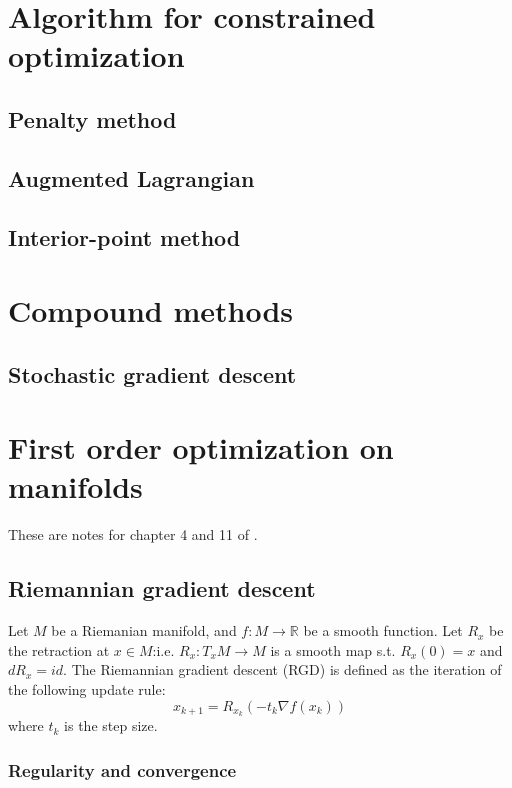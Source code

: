 \documentclass[a4paper]{mynotes}
\begin{document}
\thm{}{

}


\chapter{Algorithm for constrained optimization}
\section{Penalty method}

\section{Augmented Lagrangian}

\section{Interior-point method}

\chapter{Compound methods}

\section{Stochastic gradient descent}

\chapter{First order optimization on manifolds}
 
These are notes for chapter 4 and 11 of \cite{boumal2023introduction}.





\section{Riemannian gradient descent}

Let $M$ be a Riemanian manifold, and $f:M\to \mathbb{R}$ be a smooth function. Let $R_x$ be the retraction at $x\in M$:i.e. $R_x: T_xM\to M$ is a smooth map s.t. $R_x(0)=x$ and $dR_x=id$. The Riemannian gradient descent (RGD) is defined as the iteration of the following update rule: 
$$x_{k+1}=R_{x_k}(-t_k \nabla f(x_k))$$ where $t_k$ is the step size. 

\subsection{Regularity and convergence}
\end{document}
